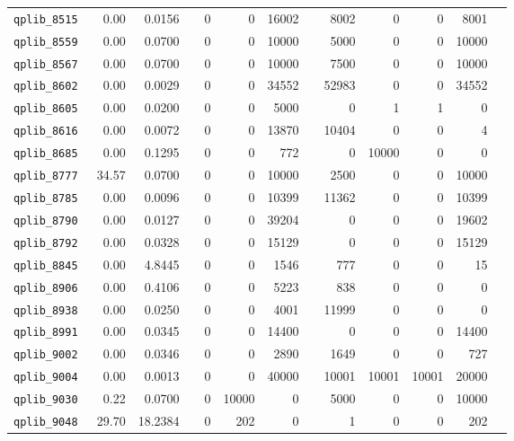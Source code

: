\begin{longtable}{lrrrrrrrrrrrr}
{\tt 	qplib\_8515	}	&	0.00	&	0.0156	&	&	0	&	0	&	16002	&	&	8002	&	0	&	0	&	8001	\\
{\tt 	qplib\_8559	}	&	0.00	&	0.0700	&	&	0	&	0	&	10000	&	&	5000	&	0	&	0	&	10000	\\
{\tt 	qplib\_8567	}	&	0.00	&	0.0700	&	&	0	&	0	&	10000	&	&	7500	&	0	&	0	&	10000	\\
{\tt 	qplib\_8602	}	&	0.00	&	0.0029	&	&	0	&	0	&	34552	&	&	52983	&	0	&	0	&	34552	\\
{\tt 	qplib\_8605	}	&	0.00	&	0.0200	&	&	0	&	0	&	5000	&	&	0	&	1	&	1	&	0	\\
{\tt 	qplib\_8616	}	&	0.00	&	0.0072	&	&	0	&	0	&	13870	&	&	10404	&	0	&	0	&	4	\\
{\tt 	qplib\_8685	}	&	0.00	&	0.1295	&	&	0	&	0	&	772	&	&	0	&	10000	&	0	&	0	\\
{\tt 	qplib\_8777	}	&	34.57	&	0.0700	&	&	0	&	0	&	10000	&	&	2500	&	0	&	0	&	10000	\\
{\tt 	qplib\_8785	}	&	0.00	&	0.0096	&	&	0	&	0	&	10399	&	&	11362	&	0	&	0	&	10399	\\
{\tt 	qplib\_8790	}	&	0.00	&	0.0127	&	&	0	&	0	&	39204	&	&	0	&	0	&	0	&	19602	\\
{\tt 	qplib\_8792	}	&	0.00	&	0.0328	&	&	0	&	0	&	15129	&	&	0	&	0	&	0	&	15129	\\
{\tt 	qplib\_8845	}	&	0.00	&	4.8445	&	&	0	&	0	&	1546	&	&	777	&	0	&	0	&	15	\\
{\tt 	qplib\_8906	}	&	0.00	&	0.4106	&	&	0	&	0	&	5223	&	&	838	&	0	&	0	&	0	\\
{\tt 	qplib\_8938	}	&	0.00	&	0.0250	&	&	0	&	0	&	4001	&	&	11999	&	0	&	0	&	0	\\
{\tt 	qplib\_8991	}	&	0.00	&	0.0345	&	&	0	&	0	&	14400	&	&	0	&	0	&	0	&	14400	\\
{\tt 	qplib\_9002	}	&	0.00	&	0.0346	&	&	0	&	0	&	2890	&	&	1649	&	0	&	0	&	727	\\
{\tt 	qplib\_9004	}	&	0.00	&	0.0013	&	&	0	&	0	&	40000	&	&	10001	&	10001	&	10001	&	20000	\\
{\tt 	qplib\_9030	}	&	0.22	&	0.0700	&	&	0	&	10000	&	0	&	&	5000	&	0	&	0	&	10000	\\
{\tt 	qplib\_9048	}	&	29.70	&	18.2384	&	&	0	&	202	&	0	&	&	1	&	0	&	0	&	202	\\


\bottomrule


\end{longtable}

